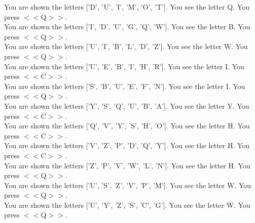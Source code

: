 \documentclass[pdflatex,sn-nature]{sn-jnl}%
\theoremstyle{thmstyleone}%
\theoremstyle{thmstyletwo}%
\theoremstyle{thmstylethree}%
\begin{document}
You are shown the letters ['D', 'U', 'I', 'M', 'O', 'T']. You see the letter Q. You press $<<$Q$>>$. $~$\\ 
You are shown the letters ['I', 'D', 'U', 'G', 'Q', 'W']. You see the letter B. You press $<<$Q$>>$. $~$\\ 
You are shown the letters ['U', 'I', 'B', 'L', 'D', 'Z']. You see the letter W. You press $<<$Q$>>$. $~$\\ 
You are shown the letters ['U', 'E', 'B', 'I', 'H', 'R']. You see the letter I. You press $<<$C$>>$. $~$\\ 
You are shown the letters ['S', 'B', 'U', 'E', 'F', 'N']. You see the letter I. You press $<<$Q$>>$. $~$\\ 
You are shown the letters ['Y', 'S', 'Q', 'U', 'B', 'A']. You see the letter Y. You press $<<$C$>>$. $~$\\ 
You are shown the letters ['Q', 'V', 'Y', 'S', 'H', 'O']. You see the letter H. You press $<<$C$>>$. $~$\\ 
You are shown the letters ['V', 'Z', 'P', 'D', 'Q', 'Y']. You see the letter H. You press $<<$C$>>$. $~$\\ 
You are shown the letters ['Z', 'P', 'V', 'W', 'L', 'N']. You see the letter H. You press $<<$Q$>>$. $~$\\ 
You are shown the letters ['U', 'S', 'Z', 'V', 'P', 'M']. You see the letter W. You press $<<$Q$>>$. $~$\\ 
You are shown the letters ['U', 'Y', 'Z', 'S', 'C', 'G']. You see the letter W. You press $<<$Q$>>$.
\end{document}
